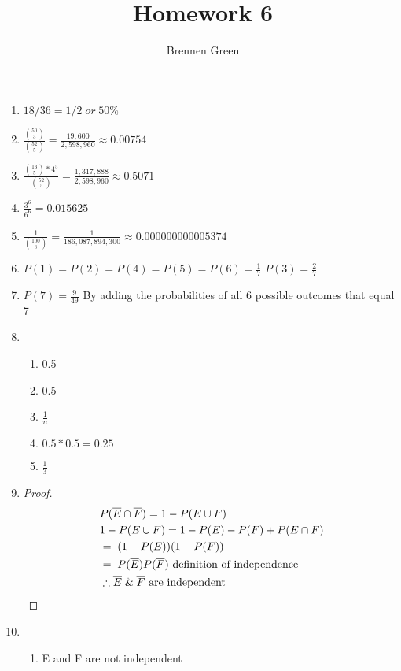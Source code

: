 \documentclass[11pt]{article}
\begin{document}
\title{Homework 6}
\author{Brennen Green}
\maketitle


\begin{enumerate}
    \item $18 / 36 = 1/2\;or\;50\%$
    \item $\frac{\binom{50}{3}}{\binom{52}{5}} = \frac{19,600}{2,598,960} \approx 0.00754$
    \item $\frac{\binom{13}{5} * 4^5}{\binom{52}{5}} = \frac{1,317,888}{2,598,960} \approx 0.5071$
    \item $\frac{3^6}{6^6} = 0.015625$
    \item $\frac{1}{\binom{100}{8}} = \frac{1}{186,087,894,300} \approx 0.000000000005374$
    \item $ P(1) = P(2) = P(4) = P(5) = P(6) = \frac{1}{7} $ $ P(3) = \frac{2}{7} $ 
    \item $ P(7) = \frac{9}{49} $ By adding the probabilities of all 6 possible outcomes that equal 7 
    \item \begin{enumerate}
        \item 0.5
        \item 0.5
        \item $\frac{1}{n}$
        \item $ 0.5 * 0.5 = 0.25 $
        \item $ \frac{1}{3} $
    \end{enumerate}
    \item \begin{proof}
        \begin{align*}
            &P(\overline{E}\cap\overline{F}) = 1 - P(E\cup F)\\
            &1 - P(E \cup F) = 1 - P(E) - P(F) + P(E \cap F) \\
            &= \; (1-P(E))(1-P(F))\\
            &= \; P(\overline{E})P(\overline{F}) \text{ definition of independence} \\
            &\therefore \overline{E}\;\&\;\overline{F} \text{ are independent} \qedhere
        \end{align*}
    \end{proof}
    \item \begin{enumerate}
        \item E and F are not independent

\end{enumerate}
\end{enumerate}
\end{document}

